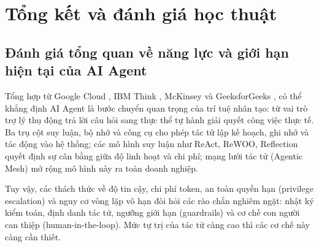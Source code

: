 \chapter{Tổng kết và đánh giá học thuật}

\section{Đánh giá tổng quan về năng lực và giới hạn hiện tại của AI Agent}
Tổng hợp từ Google Cloud \cite{google_agents}, IBM Think \cite{ibm_agents}, McKinsey \cite{mckinsey_agents} và
GeeksforGeeks \cite{gfg_rl}, có thể khẳng định AI Agent là bước chuyển quan trọng của trí tuệ nhân tạo: từ vai trò trợ lý
thụ động trả lời câu hỏi sang thực thể tự hành giải quyết công việc thực tế. Ba trụ cột suy luận, bộ nhớ và công cụ cho
phép tác tử lập kế hoạch, ghi nhớ và tác động vào hệ thống; các mô hình suy luận như ReAct, ReWOO, Reflection quyết định
sự cân bằng giữa độ linh hoạt và chi phí; mạng lưới tác tử (Agentic Mesh) mở rộng mô hình này ra toàn doanh nghiệp.

Tuy vậy, các thách thức về độ tin cậy, chi phí token, an toàn quyền hạn (privilege escalation) và nguy cơ vòng lặp vô
hạn đòi hỏi các rào chắn nghiêm ngặt: nhật ký kiểm toán, định danh tác tử, ngưỡng giới hạn (guardrails) và cơ chế con
người can thiệp (human-in-the-loop). Mức tự trị của tác tử càng cao thì các cơ chế này càng cần thiết.

